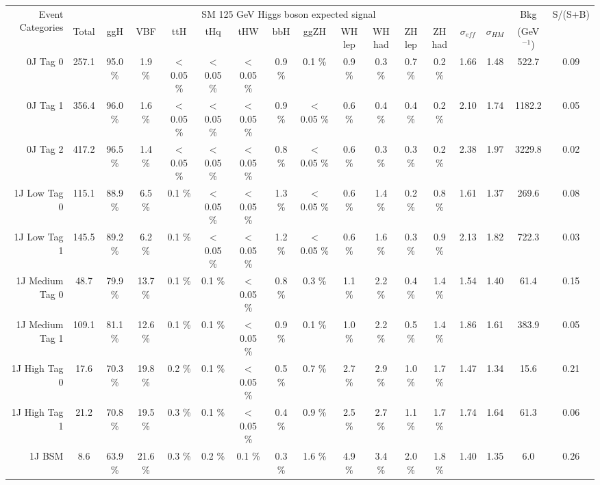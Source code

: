 \begin{tabular}{ r | c | c | c  | c | c |  c |  c |  c |  c |  c |  c |  c |  c |  c |  c |  c }
\hline
\multirow{2}{*}{Event Categories} &\multicolumn{14}{|c|}{SM 125 GeV Higgs boson expected signal} & Bkg & S/(S+B) \\ \cline{2-15}
  &  Total & ggH & VBF & ttH & tHq & tHW & bbH & ggZH & WH lep & WH had & ZH lep & ZH had &   $\sigma_{eff} $  & $\sigma_{HM} $ & (GeV$^{-1}$) & \\ 
\hline
 0J Tag 0 &  257.1  &  95.0 \%  &  1.9 \%  &  $<$0.05 \%  &  $<$0.05 \%  &  $<$0.05 \%  &  0.9 \%  &  0.1 \%  &  0.9 \%  &  0.3 \%  &  0.7 \%  &  0.2 \%  & 1.66 & 1.48 & 522.7 & 0.09 \\
 0J Tag 1 &  356.4  &  96.0 \%  &  1.6 \%  &  $<$0.05 \%  &  $<$0.05 \%  &  $<$0.05 \%  &  0.9 \%  &  $<$0.05 \%  &  0.6 \%  &  0.4 \%  &  0.4 \%  &  0.2 \%  & 2.10 & 1.74 & 1182.2 & 0.05 \\
 0J Tag 2 &  417.2  &  96.5 \%  &  1.4 \%  &  $<$0.05 \%  &  $<$0.05 \%  &  $<$0.05 \%  &  0.8 \%  &  $<$0.05 \%  &  0.6 \%  &  0.3 \%  &  0.3 \%  &  0.2 \%  & 2.38 & 1.97 & 3229.8 & 0.02 \\
 1J Low Tag 0 &  115.1  &  88.9 \%  &  6.5 \%  &  0.1 \%  &  $<$0.05 \%  &  $<$0.05 \%  &  1.3 \%  &  $<$0.05 \%  &  0.6 \%  &  1.4 \%  &  0.2 \%  &  0.8 \%  & 1.61 & 1.37 & 269.6 & 0.08 \\
 1J Low Tag 1 &  145.5  &  89.2 \%  &  6.2 \%  &  0.1 \%  &  $<$0.05 \%  &  $<$0.05 \%  &  1.2 \%  &  $<$0.05 \%  &  0.6 \%  &  1.6 \%  &  0.3 \%  &  0.9 \%  & 2.13 & 1.82 & 722.3 & 0.03 \\
 1J Medium Tag 0 &  48.7  &  79.9 \%  &  13.7 \%  &  0.1 \%  &  0.1 \%  &  $<$0.05 \%  &  0.8 \%  &  0.3 \%  &  1.1 \%  &  2.2 \%  &  0.4 \%  &  1.4 \%  & 1.54 & 1.40 & 61.4 & 0.15 \\
 1J Medium Tag 1 &  109.1  &  81.1 \%  &  12.6 \%  &  0.1 \%  &  0.1 \%  &  $<$0.05 \%  &  0.9 \%  &  0.1 \%  &  1.0 \%  &  2.2 \%  &  0.5 \%  &  1.4 \%  & 1.86 & 1.61 & 383.9 & 0.05 \\
 1J High Tag 0 &  17.6  &  70.3 \%  &  19.8 \%  &  0.2 \%  &  0.1 \%  &  $<$0.05 \%  &  0.5 \%  &  0.7 \%  &  2.7 \%  &  2.9 \%  &  1.0 \%  &  1.7 \%  & 1.47 & 1.34 & 15.6 & 0.21 \\
 1J High Tag 1 &  21.2  &  70.8 \%  &  19.5 \%  &  0.3 \%  &  0.1 \%  &  $<$0.05 \%  &  0.4 \%  &  0.9 \%  &  2.5 \%  &  2.7 \%  &  1.1 \%  &  1.7 \%  & 1.74 & 1.64 & 61.3 & 0.06 \\
 1J BSM &  8.6  &  63.9 \%  &  21.6 \%  &  0.3 \%  &  0.2 \%  &  0.1 \%  &  0.3 \%  &  1.6 \%  &  4.9 \%  &  3.4 \%  &  2.0 \%  &  1.8 \%  & 1.40 & 1.35 & 6.0 & 0.26 \\

\end{tabular}
